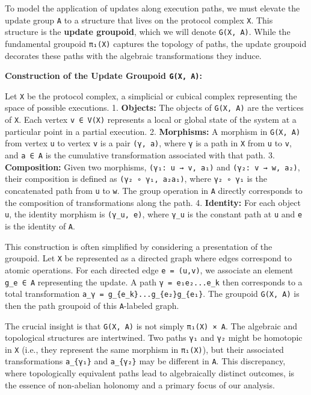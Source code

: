 \documentclass[
]{article}
\begin{document}
To model the application of updates along execution paths, we must
elevate the update group \texttt{A} to a structure that lives on the
protocol complex \texttt{X}. This structure is the \textbf{update
groupoid}, which we will denote \texttt{G(X,\ A)}. While the fundamental
groupoid \texttt{π₁(X)} captures the topology of paths, the update
groupoid decorates these paths with the algebraic transformations they
induce.

\textbf{Construction of the Update Groupoid \texttt{G(X,\ A)}:}

Let \texttt{X} be the protocol complex, a simplicial or cubical complex
representing the space of possible executions. 1. \textbf{Objects:} The
objects of \texttt{G(X,\ A)} are the vertices of \texttt{X}. Each vertex
\texttt{v\ ∈\ V(X)} represents a local or global state of the system at
a particular point in a partial execution. 2. \textbf{Morphisms:} A
morphism in \texttt{G(X,\ A)} from vertex \texttt{u} to vertex
\texttt{v} is a pair \texttt{(γ,\ a)}, where \texttt{γ} is a path in
\texttt{X} from \texttt{u} to \texttt{v}, and \texttt{a\ ∈\ A} is the
cumulative transformation associated with that path. 3.
\textbf{Composition:} Given two morphisms, \texttt{(γ₁:\ u\ →\ v,\ a₁)}
and \texttt{(γ₂:\ v\ →\ w,\ a₂)}, their composition is defined as
\texttt{(γ₂\ ∘\ γ₁,\ a₂a₁)}, where \texttt{γ₂\ ∘\ γ₁} is the
concatenated path from \texttt{u} to \texttt{w}. The group operation in
\texttt{A} directly corresponds to the composition of transformations
along the path. 4. \textbf{Identity:} For each object \texttt{u}, the
identity morphism is \texttt{(γ\_u,\ e)}, where \texttt{γ\_u} is the
constant path at \texttt{u} and \texttt{e} is the identity of
\texttt{A}.

This construction is often simplified by considering a presentation of
the groupoid. Let \texttt{X} be represented as a directed graph where
edges correspond to atomic operations. For each directed edge
\texttt{e\ =\ (u,v)}, we associate an element \texttt{g\_e\ ∈\ A}
representing the update. A path \texttt{γ\ =\ e₁e₂...e\_k} then
corresponds to a total transformation
\texttt{a\_γ\ =\ g\_\{e\_k\}...g\_\{e₂\}g\_\{e₁\}}. The groupoid
\texttt{G(X,\ A)} is then the path groupoid of this \texttt{A}-labeled
graph.

The crucial insight is that \texttt{G(X,\ A)} is not simply
\texttt{π₁(X)\ ×\ A}. The algebraic and topological structures are
intertwined. Two paths \texttt{γ₁} and \texttt{γ₂} might be homotopic in
\texttt{X} (i.e., they represent the same morphism in \texttt{π₁(X)}),
but their associated transformations \texttt{a\_\{γ₁\}} and
\texttt{a\_\{γ₂\}} may be different in \texttt{A}. This discrepancy,
where topologically equivalent paths lead to algebraically distinct
outcomes, is the essence of non-abelian holonomy and a primary focus of
our analysis.
\end{document}
